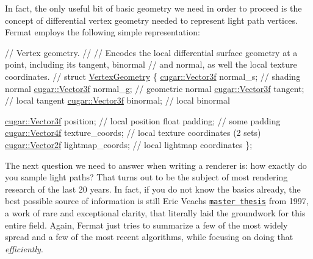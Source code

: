 \begin{DoxyParagraph}{}
In fact, the only useful bit of basic geometry we need in order to proceed is the concept of differential vertex geometry needed to represent light path vertices. Fermat employs the following simple representation\+: ~\newline

\begin{DoxyCode}
\textcolor{comment}{// Vertex geometry.}
\textcolor{comment}{// }
\textcolor{comment}{// Encodes the local differential surface geometry at a point, including its tangent, binormal}
\textcolor{comment}{// and normal, as well the local texture coordinates.}
\textcolor{comment}{// }
\textcolor{keyword}{struct }\hyperlink{struct_vertex_geometry}{VertexGeometry}
\{
   \hyperlink{structcugar_1_1_vector}{cugar::Vector3f} normal\_s;           \textcolor{comment}{// shading normal}
   \hyperlink{structcugar_1_1_vector}{cugar::Vector3f} normal\_g;           \textcolor{comment}{// geometric normal}
   \hyperlink{structcugar_1_1_vector}{cugar::Vector3f} tangent;            \textcolor{comment}{// local tangent}
   \hyperlink{structcugar_1_1_vector}{cugar::Vector3f} binormal;           \textcolor{comment}{// local binormal}

   \hyperlink{structcugar_1_1_vector}{cugar::Vector3f} position;           \textcolor{comment}{// local position}
   \textcolor{keywordtype}{float}           padding;            \textcolor{comment}{// some padding}
   \hyperlink{structcugar_1_1_vector}{cugar::Vector4f} texture\_coords;     \textcolor{comment}{// local texture coordinates (2 sets)}
   \hyperlink{structcugar_1_1_vector}{cugar::Vector2f} lightmap\_coords;    \textcolor{comment}{// local lightmap coordinates}
\};
\end{DoxyCode}
 
\end{DoxyParagraph}
\begin{DoxyParagraph}{}
The next question we need to answer when writing a renderer is\+: how exactly do you sample light paths? That turns out to be the subject of most rendering research of the last 20 years. In fact, if you do not know the basics already, the best possible source of information is still Eric Veach\textquotesingle{}s \href{http://graphics.stanford.edu/papers/veach_thesis/}{\tt master thesis} from 1997, a work of rare and exceptional clarity, that literally laid the groundwork for this entire field. Again, Fermat just tries to summarize a few of the most widely spread and a few of the most recent algorithms, while focusing on doing that {\itshape efficiently}. 
\end{DoxyParagraph}
